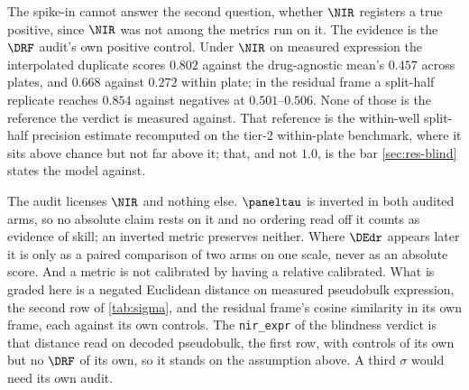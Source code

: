 The spike-in cannot answer the second question, whether $\NIR$ registers a true
positive, since $\NIR$ was not among the metrics run on it. The evidence is the
$\DRF$ audit's own positive control. Under $\NIR$ on measured expression the
interpolated
duplicate scores $0.802$ against the drug-agnostic mean's $0.457$ across plates,
and $0.668$ against $0.272$ within plate; in the residual frame a split-half
replicate reaches $0.854$ against negatives at $0.501$--$0.506$. None of those is
the reference the verdict is measured against. That reference is the within-well
split-half precision estimate recomputed on the tier-2 within-plate benchmark,
where it sits above chance but not far above it; that, and not $1.0$, is the bar
\cref{sec:res-blind} states the model against.

\begin{scopelimit}
The audit licenses $\NIR$ and nothing else. $\paneltau$ is inverted in both
audited arms, so no absolute claim rests on it and no ordering read off it counts
as evidence of skill; an inverted metric preserves neither. Where $\DEdr$
appears later it is only as a paired comparison of two arms on one scale, never
as an absolute score. And a metric is not calibrated by having a relative
calibrated. What is graded here is a negated Euclidean distance on measured
pseudobulk expression, the second row of \cref{tab:sigma}, and the residual
frame's cosine similarity in its own frame, each against its own controls. The
\texttt{nir\_expr} of the blindness verdict is that distance read on decoded
pseudobulk, the first row, with controls of its own but no $\DRF$ of its own, so
it stands on the assumption above. A third $\sigma$ would need its own audit.
\end{scopelimit}

